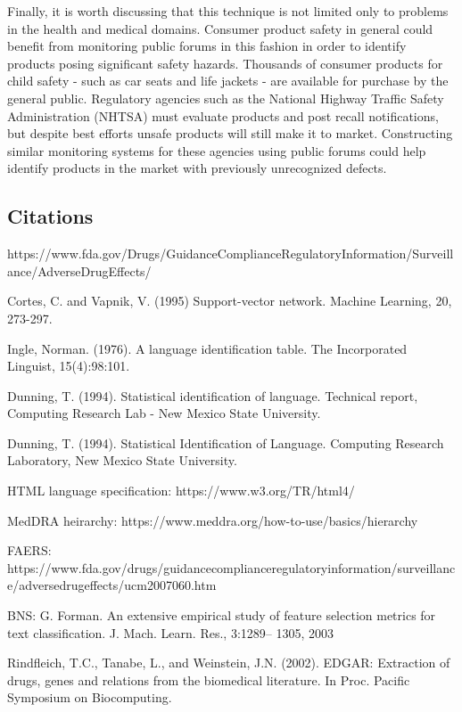 \documentclass[twoside,11pt]{article}
\begin{document}
Finally, it is worth discussing that this technique is not limited only to problems in the health and medical domains. Consumer product safety in general could benefit from monitoring public forums in this fashion in order to identify products posing significant safety hazards. Thousands of consumer products for child safety - such as car seats and life jackets - are available for purchase by the general public. Regulatory agencies such as the National Highway Traffic Safety Administration (NHTSA) must evaluate products and post recall notifications, but despite best efforts unsafe products will still make it to market. Constructing similar monitoring systems for these agencies using public forums could help identify products in the market with previously unrecognized defects.




\subsection{Citations}
https://www.fda.gov/Drugs/GuidanceComplianceRegulatoryInformation/Surveillance/AdverseDrugEffects/


Cortes, C. and Vapnik, V. (1995) Support-vector network. Machine Learning, 20, 273-297.




Ingle, Norman. (1976). A language identification table.
The Incorporated Linguist, 15(4):98:101.

Dunning, T. (1994). Statistical identification of language. Technical report, Computing
Research Lab - New Mexico State University.


Dunning, T. (1994). Statistical Identification of Language. Computing Research Laboratory,
New Mexico State University.

HTML language specification: https://www.w3.org/TR/html4/

MedDRA heirarchy:  https://www.meddra.org/how-to-use/basics/hierarchy

FAERS: https://www.fda.gov/drugs/guidancecomplianceregulatoryinformation/surveillance/adversedrugeffects/ucm2007060.htm

BNS:
G. Forman. An extensive empirical study of feature selection
metrics for text classification. J. Mach. Learn. Res., 3:1289–
1305, 2003


Rindfleich, T.C., Tanabe, L., and Weinstein, J.N. (2002). EDGAR: Extraction of drugs, genes and relations from the biomedical literature.  In Proc. Pacific Symposium on Biocomputing.
\end{document}
